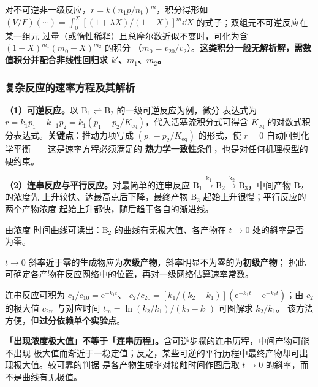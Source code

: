对不可逆非一级反应，$r=k(n_1p/n_{\mathrm t})^{m}$，积分得形如
$(V/F)(\cdots)=\int_0^X[(1+\lambda X)/(1-X)]^{m}\dd X$ 的式子；双组元不可逆反应在某一组元
过量（或惰性稀释）且总摩尔数近似不变时，可化为含 $(1-X)^{m_1}(m_0-X)^{m_2}$ 的积分
（$m_0=v_{20}/v_2$）。\textbf{这类积分一般无解析解，需数值积分并配合非线性回归求
$k'$、$m_1$、$m_2$。}

\subsubsection{复杂反应的速率方程及其解析}

\textbf{（1）可逆反应。}以 $\mathrm{B_1\rightleftharpoons B_2}$ 的一级可逆反应为例，微分
表达式为 $r=k_1p_1-k_{-1}p_2=k_1(p_1-p_2/K_{\mathrm{eq}})$，代入活塞流积分式可得含
$K_{\mathrm{eq}}$ 的对数式积分表达式。\textbf{关键点}：推动力项写成
$(p_1-p_2/K_{\mathrm{eq}})$ 的形式，使 $r=0$ 自动回到化学平衡——这是速率方程必须满足的
\textbf{热力学一致性}条件，也是对任何机理模型的硬约束。

\textbf{（2）连串反应与平行反应。}对最简单的连串反应
$\mathrm{B_1\xrightarrow{k_1}B_2\xrightarrow{k_2}B_3}$，中间产物 $\mathrm{B_2}$ 的浓度先
上升较快、达最高点后下降，最终产物 $\mathrm{B_3}$ 起始上升很慢；平行反应的两个产物浓度
起始上升都快，随后趋于各自的渐进线。

\begin{obs}
由浓度-时间曲线可读出：$\mathrm{B}_2$ 的曲线有无极大值、各产物在 $t\to0$ 处的斜率是否
为零。\end{obs}
\begin{infer}
$t\to0$ 斜率近于零的生成物应为\textbf{次级产物}，斜率明显不为零的为\textbf{初级产物}；
据此可确定各产物在反应网络中的位置，再对一级网络估算速率常数。\end{infer}

连串反应可积为 $c_1/c_{10}=\mathrm{e}^{-k_1t}$、
$c_2/c_{20}=[k_1/(k_2-k_1)](\mathrm{e}^{-k_1t}-\mathrm{e}^{-k_2t})$；由 $c_2$ 的极大值
$c_{2\mathrm m}$ 与对应时间 $t_{\mathrm m}=\ln(k_2/k_1)/(k_2-k_1)$ 可图解求 $k_2/k_1$。
该方法方便，但\textbf{过分依赖单个实验点}。

\begin{pitfall}
\textbf{「出现浓度极大值」不等于「连串历程」。}含可逆步骤的连串历程，中间产物可能不出现
极大值而渐近于一稳定值；反之，某些可逆的平行历程中最终产物却可出现极大值。较可靠的判据
是各产物生成率对接触时间作图后取 $t\to0$ 的斜率，而不是曲线有无极值。
\end{pitfall}

